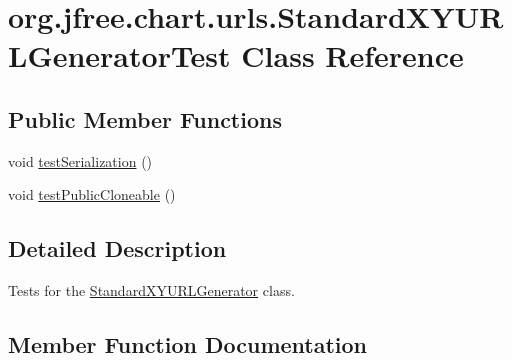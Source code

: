 \hypertarget{classorg_1_1jfree_1_1chart_1_1urls_1_1_standard_x_y_u_r_l_generator_test}{}\section{org.\+jfree.\+chart.\+urls.\+Standard\+X\+Y\+U\+R\+L\+Generator\+Test Class Reference}
\label{classorg_1_1jfree_1_1chart_1_1urls_1_1_standard_x_y_u_r_l_generator_test}
\subsection*{Public Member Functions}
\begin{DoxyCompactItemize}
\item 
void \mbox{\hyperlink{classorg_1_1jfree_1_1chart_1_1urls_1_1_standard_x_y_u_r_l_generator_test_a4196d7679f8755c2bd97c88cb8d62456}{test\+Serialization}} ()
\item 
void \mbox{\hyperlink{classorg_1_1jfree_1_1chart_1_1urls_1_1_standard_x_y_u_r_l_generator_test_aac7dad1133daacfc888e0a367cd026ec}{test\+Public\+Cloneable}} ()
\end{DoxyCompactItemize}


\subsection{Detailed Description}
Tests for the \mbox{\hyperlink{classorg_1_1jfree_1_1chart_1_1urls_1_1_standard_x_y_u_r_l_generator}{Standard\+X\+Y\+U\+R\+L\+Generator}} class. 

\subsection{Member Function Documentation}
\mbox{\label{classorg_1_1jfree_1_1chart_1_1urls_1_1_standard_x_y_u_r_l_generator_test_aac7dad1133daacfc888e0a367cd026ec}} 
